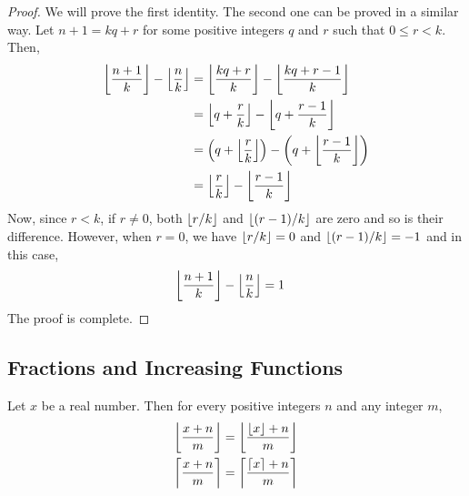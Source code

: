 \begin{proof}
We will prove the first identity. The second one can be proved in a similar way. Let $n+1=kq+r$ for some positive integers $q$ and $r$ such that $0 \leq r <k$. Then,
\begin{align*}
	\left\lfloor{\frac{n+1}{k}}\right\rfloor- \left\lfloor{\frac{n}{k}}\right\rfloor
	&= \left\lfloor{\frac{kq+r}{k}}\right\rfloor - \left\lfloor{\frac{kq+r-1}{k}}\right\rfloor\\
	&= \left\lfloor{q+\frac{r}{k}}\right\rfloor - \left\lfloor{q+\frac{r-1}{k}}\right\rfloor\\
	&= \left(q+\left\lfloor{\frac{r}{k}}\right\rfloor\right) -\left(q+\left\lfloor{\frac{r-1}{k}}\right\rfloor\right)\\
	&= \left\lfloor{\frac{r}{k}}\right\rfloor- \left\lfloor{\frac{r-1}{k}}\right\rfloor
\end{align*}
Now, since $r<k$, if $r \neq 0$, both $\left\lfloor{r/k}\right\rfloor$ and $\left\lfloor{(r-1)/k}\right\rfloor$ are zero and so is their difference. However, when $r=0$, we have $\left\lfloor{r/k}\right\rfloor=0$ and $\left\lfloor{(r-1)/k}\right\rfloor=-1$ and in this case,
\begin{align*}
	\left\lfloor{\frac{n+1}{k}}\right\rfloor- \left\lfloor{\frac{n}{k}}\right\rfloor
	& = 1
\end{align*}
The proof is complete.
\end{proof}

\subsection{Fractions and Increasing Functions}
\begin{theorem}
Let $x$ be a real number. Then for every positive integers $n$ and any integer $m$,
\begin{align*}
	\left\lfloor{\frac{x+n}{m}}\right\rfloor
	& = \left\lfloor{\frac{\left\lfloor{x}\right\rfloor+n}{m}}\right\rfloor\\
	\left\lceil \frac{x+n}{m}\right\rceil
	& = \left\lceil \frac{\lceil x \rceil+n}{m}\right\rceil
\end{align*}
\end{theorem}

